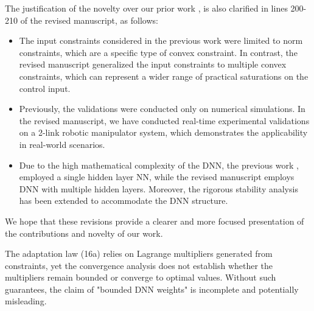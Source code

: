 \documentclass[12pt,english]{reviewresponse}
\begin{document}
\begin{revresponse}
  \bigskip

  The justification of the novelty over our prior work \cite{Ryu:2025aa}, \cite{Ryu:2025ab} is also clarified in lines 200-210 of the revised manuscript, as follows:
  \begin{itemize}
    \item 
      The input constraints considered in the previous work \cite{Ryu:2025aa} were limited to norm constraints, which are a specific type of convex constraint.
      In contrast, the revised manuscript generalized the input constraints to multiple convex constraints, which can represent a wider range of practical saturations on the control input.

    \item 
      Previously, the validations were conducted only on numerical simulations.
      In the revised manuscript, we have conducted real-time experimental validations on a 2-link robotic manipulator system, which demonstrates the applicability in real-world scenarios.

    \item 
      Due to the high mathematical complexity of the DNN, the previous work \cite{Ryu:2025aa}, \cite{Ryu:2025ab} employed a single hidden layer NN, while the revised manuscript employs DNN with multiple hidden layers.
      Moreover, the rigorous stability analysis has been extended to accommodate the DNN structure.
      
  \end{itemize}

  \vspace{1.2em}

  We hope that these revisions provide a clearer and more focused presentation of the contributions and novelty of our work.

\end{revresponse}

%
\begin{revcomment}[1][1]{}
	The adaptation law (16a) relies on Lagrange multipliers generated from constraints, yet the convergence analysis does not establish whether the multipliers remain bounded or converge to optimal values. Without such guarantees, the claim of "bounded DNN weights" is incomplete and potentially misleading.
\end{revcomment}
\end{document}
